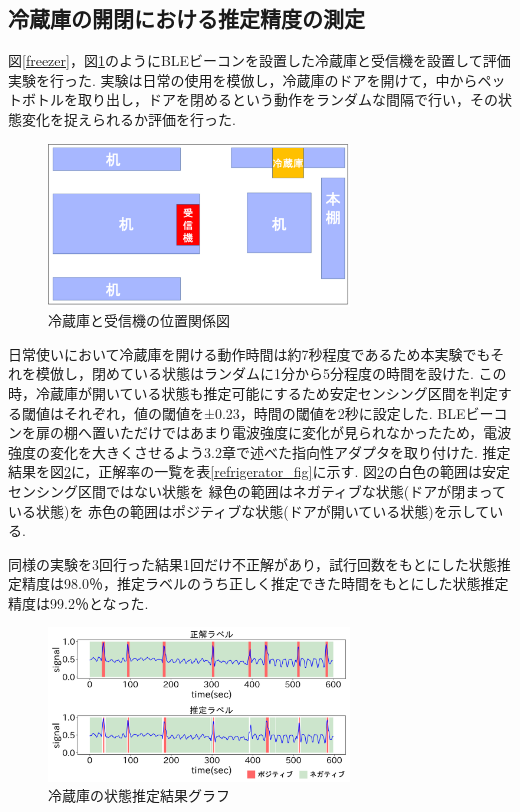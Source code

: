 \documentclass[Japanese]{dicomopapers}
\begin{document}
\subsection{冷蔵庫の開閉における推定精度の測定}
図\ref{freezer}，図\ref{refrigerator_position}のようにBLEビーコンを設置した冷蔵庫と受信機を設置して評価実験を行った.
実験は日常の使用を模倣し，冷蔵庫のドアを開けて，中からペットボトルを取り出し，ドアを閉めるという動作をランダムな間隔で行い，その状態変化を捉えられるか評価を行った.


\begin{figure}[tbh]
    \centering
    \includegraphics[width=8cm]{refrigerator_position.png}
    \caption{冷蔵庫と受信機の位置関係図}
    \label{refrigerator_position}
\end{figure}


日常使いにおいて冷蔵庫を開ける動作時間は約7秒程度であるため本実験でもそれを模倣し，閉めている状態はランダムに1分から5分程度の時間を設けた.
この時，冷蔵庫が開いている状態も推定可能にするため安定センシング区間を判定する閾値はそれぞれ，値の閾値を±0.23，時間の閾値を2秒に設定した.
BLEビーコンを扉の棚へ置いただけではあまり電波強度に変化が見られなかったため，電波強度の変化を大きくさせるよう3.2章で述べた指向性アダプタを取り付けた.
推定結果を図\ref{refrigerator_graph}に，正解率の一覧を表\ref{refrigerator_fig}に示す.
図\ref{refrigerator_graph}の白色の範囲は安定センシング区間ではない状態を 緑色の範囲はネガティブな状態(ドアが閉まっている状態)を 赤色の範囲はポジティブな状態(ドアが開いている状態)を示している.

同様の実験を3回行った結果1回だけ不正解があり，試行回数をもとにした状態推定精度は98.0％，推定ラベルのうち正しく推定できた時間をもとにした状態推定精度は99.2％となった.


\begin{figure}[tbh]
    \centering
    \includegraphics[width=8cm]{refrigerator_graph.png}
    \caption{冷蔵庫の状態推定結果グラフ}
    \label{refrigerator_graph}
\end{figure}
\end{document}
